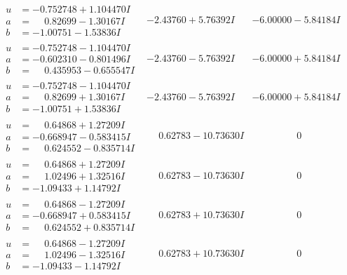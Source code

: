 \documentclass[1p]{elsarticle_modified}
\theoremstyle{definition}
\begin{document}
$$\begin{array}{c|c|c}
\begin{aligned}
u &= -0.752748 + 1.104470 I \\
a &= \phantom{-}0.82699 - 1.30167 I \\
b &= -1.00751 - 1.53836 I\end{aligned}
 & -2.43760 + 5.76392 I & -6.00000 - 5.84184 I \\ \hline\begin{aligned}
u &= -0.752748 - 1.104470 I \\
a &= -0.602310 - 0.801496 I \\
b &= \phantom{-}0.435953 - 0.655547 I\end{aligned}
 & -2.43760 - 5.76392 I & -6.00000 + 5.84184 I \\ \hline\begin{aligned}
u &= -0.752748 - 1.104470 I \\
a &= \phantom{-}0.82699 + 1.30167 I \\
b &= -1.00751 + 1.53836 I\end{aligned}
 & -2.43760 - 5.76392 I & -6.00000 + 5.84184 I \\ \hline\begin{aligned}
u &= \phantom{-}0.64868 + 1.27209 I \\
a &= -0.668947 - 0.583415 I \\
b &= \phantom{-}0.624552 - 0.835714 I\end{aligned}
 & \phantom{-}0.62783 - 10.73630 I & \phantom{-0.000000 } 0 \\ \hline\begin{aligned}
u &= \phantom{-}0.64868 + 1.27209 I \\
a &= \phantom{-}1.02496 + 1.32516 I \\
b &= -1.09433 + 1.14792 I\end{aligned}
 & \phantom{-}0.62783 - 10.73630 I & \phantom{-0.000000 } 0 \\ \hline\begin{aligned}
u &= \phantom{-}0.64868 - 1.27209 I \\
a &= -0.668947 + 0.583415 I \\
b &= \phantom{-}0.624552 + 0.835714 I\end{aligned}
 & \phantom{-}0.62783 + 10.73630 I & \phantom{-0.000000 } 0 \\ \hline\begin{aligned}
u &= \phantom{-}0.64868 - 1.27209 I \\
a &= \phantom{-}1.02496 - 1.32516 I \\
b &= -1.09433 - 1.14792 I\end{aligned}
 & \phantom{-}0.62783 + 10.73630 I & \phantom{-0.000000 } 0 \\ \hline\begin{aligned}

\end{aligned}
\end{array}$$
\end{document}
